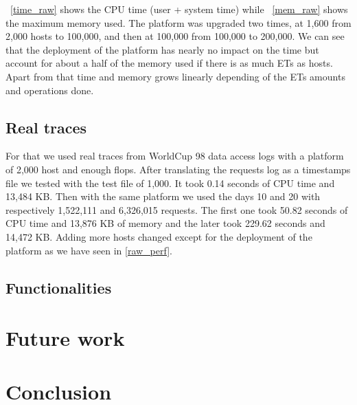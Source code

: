 \documentclass[a4paper]{IEEEtran}
\begin{document}
    \figurename~\ref{time_raw} shows the CPU time (user + system time) while 
    \figurename~\ref{mem_raw} shows the maximum memory used. The platform was
    upgraded two times, at 1,600 from 2,000 hosts to 100,000, and then at
    100,000 from 100,000 to 200,000. We can see that the deployment of the 
    platform has nearly no impact on the time but account for about a half of 
    the memory used if there is as much ETs as hosts. Apart from that time and 
    memory grows linearly depending of the ETs amounts and operations done.
    
    
  \subsection{Real traces}
    For that we used real traces from WorldCup 98 data access logs \cite{wc98}
    with a platform of 2,000 host and enough flops. After translating the
    requests log as a timestamps file we tested with the test file of 1,000. It
    took 0.14 seconds of CPU time and 13,484 KB. Then with the same platform we
    used the days 10 and 20 with respectively 1,522,111 and 6,326,015 requests.
    The first one took 50.82 seconds of CPU time and 13,876 KB of memory and
    the later took 229.62 seconds and 14,472 KB. Adding more hosts changed 
    except for the deployment of the platform as we have seen in \ref{raw_perf}.
  
  \subsection{Functionalities}
  

\section{Future work} \label{futurework}
  

\section{Conclusion} \label{conclu}





\end{document}
